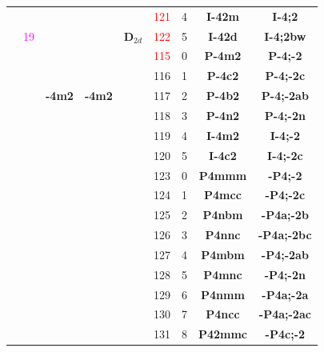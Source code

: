 \documentclass{article}      %
\begin{document}
\begin{small}
\begin{longtable}[c]{|c|c|c|c|c|c|c|c|c|}
	  & & & & &\textrm{\textcolor{red}{121}}&\textrm{4} &\textbf{I-42m} &\textbf{I-4;2} \\\cline{6-9} 
& \textrm{\textcolor{magenta}{19}} & & &$\mathbf{D}_{2d}$ &\textrm{\textcolor{red}{122}}  &\textrm{5} &\textbf{I-42d} &\textbf{I-4;2bw}\\\cline{3-4}\cline{6-9} 
	  & & & & &\textrm{\textcolor{red}{115}}  &\textrm{0} &\textbf{P-4m2}       &\textbf{P-4;-2}\\\cline{6-9}        
	  & & & & &\textrm{116}  &\textrm{1} &\textbf{P-4c2}       &\textbf{P-4;-2c}\\\cline{6-9}         
          & & \textbf{-4m2} & \textbf{-4m2} & &\textrm{117}  &\textrm{2} &\textbf{P-4b2}       &\textbf{P-4;-2ab}\\\cline{6-9}      
          & & & & &\textrm{118}  &\textrm{3} &\textbf{P-4n2}       &\textbf{P-4;-2n}\\\cline{6-9}       
          & & & & &\textrm{119}  &\textrm{4} &\textbf{I-4m2}       &\textbf{I-4;-2}\\\cline{6-9}        
          & & & & &\textrm{120}  &\textrm{5} &\textbf{I-4c2}       &\textbf{I-4;-2c}\\\cline{2-9}       
          & & & & &\textrm{123} &\textrm{0} &\textbf{P4mmm}       &\textbf{-P4;-2}\\\cline{6-9}        
          & & & & &\textrm{124} &\textrm{1} &\textbf{P4mcc}       &\textbf{-P4;-2c}\\\cline{6-9}       
          & & & & &\textrm{125} &\textrm{2} &\textbf{P4nbm}       &\textbf{-P4a;-2b}\\\cline{6-9}      
          & & & & &\textrm{126} &\textrm{3} &\textbf{P4nnc}       &\textbf{-P4a;-2bc}\\\cline{6-9}     
          & & & & &\textrm{127} &\textrm{4} &\textbf{P4mbm}       &\textbf{-P4;-2ab}\\\cline{6-9}      
          & & & & &\textrm{128} &\textrm{5} &\textbf{P4mnc}       &\textbf{-P4;-2n}\\\cline{6-9}       
          & & & & &\textrm{129} &\textrm{6} &\textbf{P4nmm}       &\textbf{-P4a;-2a}\\\cline{6-9}      
          & & & & &\textrm{130} &\textrm{7} &\textbf{P4ncc}       &\textbf{-P4a;-2ac}\\\cline{6-9}     
          & & & & &\textrm{131} &\textrm{8} &\textbf{P42mmc}     &\textbf{-P4c;-2}\\\cline{6-9}        

\end{longtable}
\end{small}
\end{document}
